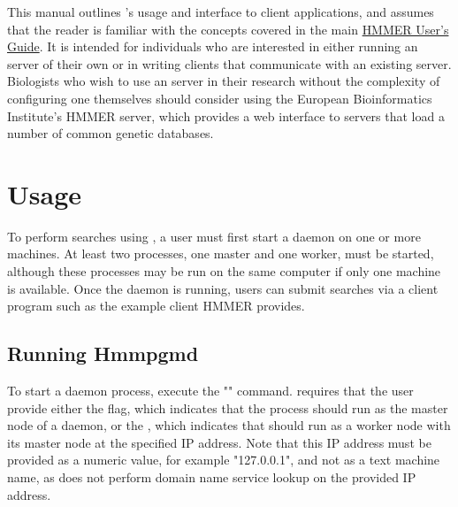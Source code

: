 \documentclass[notoc,justified]{tufte-book}    %
\begin{document}
This manual outlines 's usage and interface to client applications, and assumes that the reader is familiar with the concepts covered in the main \underline{HMMER User's Guide}.  It is intended for individuals who are interested in either running an  server of their own or in writing clients that communicate with an existing  server.   Biologists who wish to use an  server in their research without the complexity of configuring one themselves should consider using the European Bioinformatics Institute's HMMER server, which provides a web interface to  servers that load a number of common genetic databases.
 

\chapter{Usage}
To perform searches using , a user must first start a daemon on one or more machines.  At least two  processes, one master and one worker, must be started, although these processes may be run on the same computer if only one machine is available.  Once the daemon is running, users can submit searches via a client program such as the  example client HMMER provides.

\section{Running Hmmpgmd}
To start a daemon process, execute the "" command.   requires that the user provide either the  flag, which indicates that the process should run as the master node of a daemon, or the , which indicates that  should run as a worker node with its master node at the specified IP address.  Note that this IP address must be provided as a numeric value, for example "127.0.0.1", and not as a text machine name, as  does not perform domain name service lookup on the provided IP address.  
\end{document}

